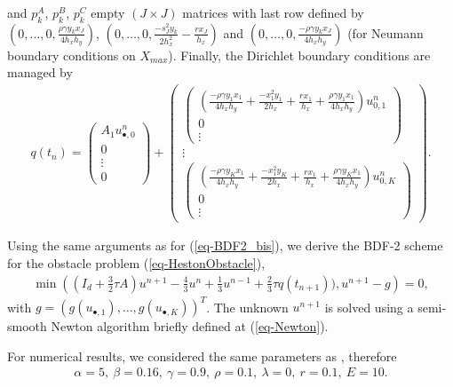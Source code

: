 \documentclass[12pt,a4paper]{article}
\begin{document}
and $p^A_k$, $p^B_k$, $p^C_k$ empty $(J \times J)$ matrices with last row defined by $(0,\dots,0,\frac{\rho \gamma y_k x_J}{4 h_x h_y})$, $(0,\dots,0,\frac{-s_J^2 y_k}{2 h_x^2} - \frac{r x_J}{h_x})$ and $(0,\dots,0,\frac{-\rho \gamma y_k x_J}{4 h_x h_y})$ (for Neumann boundary conditions on $X_{max}$). Finally, the Dirichlet boundary conditions are managed by
\begin{align*}
q(t_n) = 
\begin{pmatrix}
	A_1 u_{\bullet, 0}^n \\
	0 \\
	\vdots \\
	0
\end{pmatrix} +
\begin{pmatrix}
\begin{pmatrix}
		\left( \frac{-\rho \gamma y_1 x_1}{4 h_x h_y} + \frac{-x_1^2 y_1}{2h_x} + \frac{r x_1}{h_x} + \frac{\rho \gamma y_1 x_1}{4 h_x h_y} \right) u_{0,1}^n \\
		0 \\
		\vdots
\end{pmatrix} \\
\vdots \\ 
\begin{pmatrix}
		\left( \frac{-\rho \gamma y_K x_1}{4 h_x h_y} + \frac{-x_1^2 y_K}{2h_x} + \frac{r x_1}{h_x} + \frac{\rho \gamma y_K x_1}{4 h_x h_y} \right) u_{0,K}^n \\
		0 \\
		\vdots
\end{pmatrix}
\end{pmatrix}.
\end{align*}

Using the same arguments as for (\ref{eq-BDF2_bis}), we derive the BDF-2 scheme for the obstacle problem (\ref{eq-HestonObstacle}),
\begin{align*}
	\min\left( (I_d +\frac{3}{2} \tau A) u^{n+1} - \frac{4}{3} u^n + \frac{1}{3} u^{n-1} + \frac{2}{3} \tau q(t_{n+1})), u^{n+1} - g \right) = 0,
\end{align*}
with $g = (g(u_{\bullet,1}),\dots,g(u_{\bullet,K}))^T$. The unknown $u^{n+1}$ is solved using a semi-smooth Newton algorithm briefly defined at (\ref{eq-Newton}).

For numerical results, we considered the same parameters as \cite{Oosterlee}, therefore
\begin{align*}
	\alpha = 5, \: \beta = 0.16, \: \gamma = 0.9, \: \rho = 0.1, \: \lambda = 0, \: r = 0.1, \: E = 10.
\end{align*}
\end{document}
